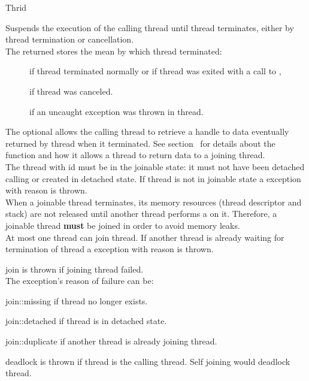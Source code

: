 \begin{classpage}{Thrid}
\begin{mandescription}
  Suspends the execution of the calling thread until  thread terminates, either by thread termination or cancellation.
  \\
  The returned  stores the mean by which  thread terminated:
  \begin{description}
    \item[] if  thread terminated normally or
      if  thread was exited with a call to ,
    \item[] if  thread was canceled.
    \item[] if an uncaught exception was thrown in  thread.
  \end{description}
  The optional  allows the calling thread to retrieve a handle to data eventually returned by  thread when it terminated.
  See section~ for details about the  function and how it allows a thread to return data to a joining thread.
  \\
  The thread with  id must be in the joinable state: it must not have been detached calling  or created in detached state.
  If  thread is not in joinable state a  exception with reason  is thrown.
  \\
  When a joinable thread terminates, its memory resources (thread descriptor and stack) are not released until another thread performs a  on it.
  Therefore, a joinable thread {\bf must} be joined in order to avoid memory leaks.
  \\
  At most one thread can join  thread. 
  If another thread is already waiting for termination of  thread a  exception with reason  is thrown.
  \begin{exception}
    \item[join] is thrown if joining  thread failed.\\
      The exception's reason of failure can be:
      \begin{exreason}
        \item[join::missing] if  thread no longer exists.
        \item[join::detached] if  thread is in detached state.
        \item[join::duplicate] if another thread is already joining  thread.
      \end{exreason}
    \item[deadlock] is thrown if  thread is the calling thread.
      Self joining would deadlock  thread.
  \end{exception}


\end{mandescription}
\end{classpage}
